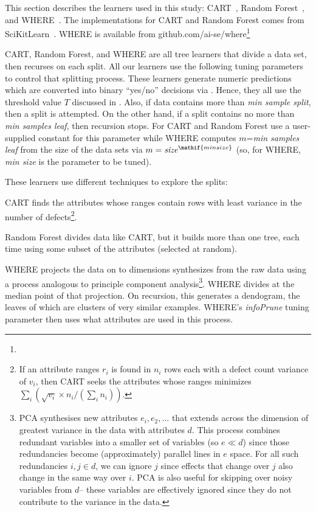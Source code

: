 This section describes the learners used in this study: CART~\cite{brieman00}, Random Forest~\cite{breiman84}, 
and WHERE~\cite{menzies2013local}. The implementations
for CART and Random Forest comes from 
SciKitLearn~\cite{scikit-learn}.
WHERE is available from
github.com/ai-se/where\footnote{}

CART, Random Forest, and WHERE are all  tree learners that divide a data set, then recurses
on each split.
All our learners use the following tuning parameters to control that splitting process.
These learners
generate numeric predictions which are converted
into binary ``yes/no'' decisions via . Hence, they all use the threshold value $T$ discussed in .
Also, if data contains more than {\em min sample split}, then a split is attempted.
On the other hand, if a split contains no more than {\em min samples leaf}, then recursion stops. For CART and Random Forest use a 
user-supplied constant for this parameter while
WHERE computes $m$={\em min samples leaf} from the size of the data
sets via  $m=\mathit{size}^\mathif{min size}$ (so, for WHERE,
{\em min size} is the parameter to be tuned).

These learners use different techniques to explore the splits:
\bi
\item
CART finds the attributes whose ranges contain rows with least variance in the number
of defects\footnote{If an attribute ranges $r_i$ is found in 
$n_i$ rows each with a  defect count variance of $v_i$, then CART seeks the attributes
whose ranges minimizes $\sum_i \left(\sqrt{v_i}\times n_i/(\sum_i n_i)\right)$.}.
\item
Random Forest    divides data like CART,
but it builds more than one tree, each time using some subset of
the attributes (selected at random). 
\item
WHERE projects the data on to dimensions synthesizes from the raw data using
a process analogous to principle component analysis\footnote{
PCA  synthesises  new
attributes $e_i, e_2,...$
that extends across the dimension of greatest  variance in the data  with attributes $d$.  
This process  combines
redundant  variables into a smaller set of variables  (so $e \ll d$) since those
redundancies become (approximately) parallel lines
in $e$ space. For all such redundancies \mbox{$i,j \in d$}, we 
can ignore $j$ 
since effects that change over $j$ also
change in the same way over $i$.
PCA is also useful for skipping over noisy variables from $d$-- these
variables are effectively ignored since    they  do not contribute to the variance in the data.}.
WHERE   divides  at the median point of that projection. On recursion,
this generates a dendogram, the leaves of which are clusters of  very similar examples.
\ei
WHERE's {\em infoPrune} tuning parameter then uses  what attributes are used in this process.

